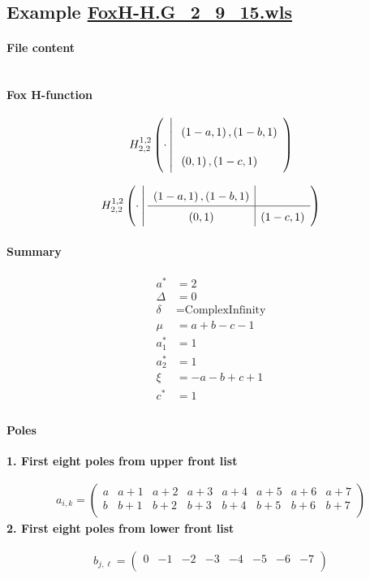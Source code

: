 \documentclass[preview]{standalone}
\begin{document}
\subsection{Example \url{FoxH-H.G_2_9_15.wls}}

\paragraph{File content}

\inputminted{text}{../Examples/FoxH-H.G_2_9_15.wls}

\paragraph{Fox H-function}

\begin{align*}
  \FoxH
    {1,2}
    {2,2}
    {\cdot}
    {\left(1-a, 1\right), \left(1-b, 1\right)}
    {\left(0, 1\right), \left(1-c, 1\right)}
\end{align*}

\begin{align*}
  \FoxHext
    {1,2}
    {2,2}
    {\cdot}
    {\left(1-a, 1\right), \left(1-b, 1\right)}
    {}
    {\left(0, 1\right)}
    {\left(1-c, 1\right)}
\end{align*}

\paragraph{Summary}

\begin{align*}
  a^*    & = 2 \\
  \Delta & = 0 \\
  \delta & = \text{ComplexInfinity} \\
  \mu    & = a+b-c-1 \\
  a_1^*  & = 1 \\
  a_2^*  & = 1 \\
  \xi    & = -a-b+c+1 \\
  c^*    & = 1 \\
\end{align*}

\paragraph{Poles}

\noindent\textbf{1. First eight poles from upper front list}

\begin{align*}
  a_{i,k} = 
  \left(
\begin{array}{cccccccc}
 a & a+1 & a+2 & a+3 & a+4 & a+5 & a+6 & a+7 \\
 b & b+1 & b+2 & b+3 & b+4 & b+5 & b+6 & b+7 \\
\end{array}
\right)
\end{align*}
\noindent\textbf{2. First eight poles from lower front list}

\begin{align*}
  b_{j,\ell} = 
  \left(
\begin{array}{cccccccc}
 0 & -1 & -2 & -3 & -4 & -5 & -6 & -7 \\
\end{array}
\right)
\end{align*}
\end{document}
